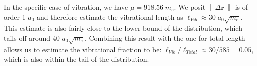 \documentclass[letterpaper,12pt]{article}
\renewcommand{\vec}[1]{\mathbf{#1}}
\newcommand{\norm}[1]{\left\lVert#1\right\rVert}
\begin{document}
In the specific case of  vibration, we have $\mu = 918.56\;m_e$. We posit $\norm{\Delta \vec{r}\,}$ is of order 1 $a_0$ and therefore estimate the vibrational length as $\ell_{Vib} \approx 30\; a_0 \sqrt{m_{e}}$. This estimate is also fairly close to the lower bound of the distribution, which tails off around 40 $ a_0 \sqrt{m_{e}}$. Combining this result with the one for total length allows us to estimate the vibrational fraction to be: $\ell_{Vib}/\ell_{Total} \approx 30/585 = 0.05$, which is also within the tail of the distribution.



\end{document}
